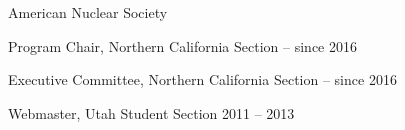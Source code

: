 \begin{list1}
\item[] American Nuclear Society  
\begin{list2}
\item Program Chair, Northern California Section \hfill{ -- since 2016}
\item Executive Committee, Northern California Section \hfill{ -- since 2016}
\item Webmaster, Utah Student Section \hfill{2011 --  2013}
\end{list2}
\end{list1}
